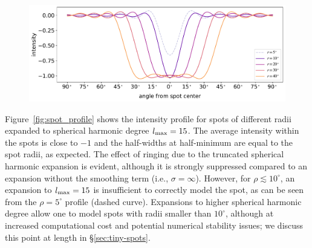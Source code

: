 \documentclass[modern]{aastex62}
\begin{document}
\begin{figure}[t!]
    \begin{centering}
        \includegraphics[width=\linewidth]{figures/spot_profile.pdf}
    \end{centering}
\end{figure}

Figure~\ref{fig:spot_profile} shows the intensity profile for spots of
different radii expanded to spherical harmonic degree $l_{\mathrm{max}} = 15$.
The average intensity
within the spots is close to $-1$ and the half-widths at half-minimum are
equal to the spot radii, as expected.
The effect of ringing due to the truncated spherical harmonic expansion is
evident, although it is strongly suppressed compared to an expansion
without the smoothing term (i.e., $\sigma = \infty$). However, for
$\rho \lesssim 10^\circ$, an expansion to $l_{\mathrm{max}} = 15$ is
insufficient to correctly model the spot, as can be seen from the
$\rho = 5^\circ$ profile (dashed curve). Expansions to higher spherical harmonic
degree allow one to model spots with radii smaller than $10^\circ$, although
at increased computational cost and potential numerical stability issues;
we discuss this point at length in \S\ref{sec:tiny-spots}.
\end{document}
